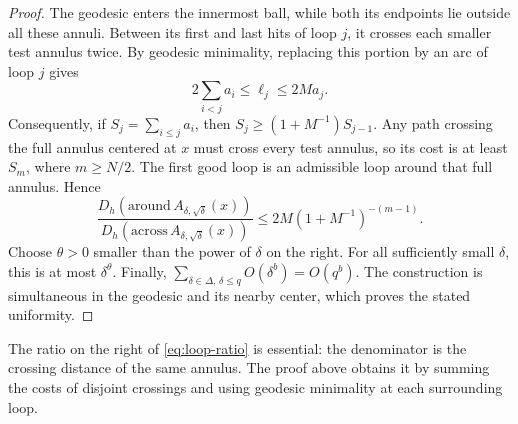 \documentclass[11pt]{article}
\theoremstyle{definition}
\theoremstyle{remark}
\begin{document}
\begin{proof}
The geodesic enters the innermost ball, while both its endpoints
lie outside all these annuli. Between its first and last hits of
loop $j$, it crosses each smaller test annulus twice. By geodesic
minimality, replacing this portion by an arc of loop $j$ gives
\[
                  2\sum_{i<j}a_i\le\ell_j\le2M a_j.
\]
Consequently, if $S_j=\sum_{i\le j}a_i$, then
$S_j\ge(1+M^{-1})S_{j-1}$. Any path crossing the full annulus
centered at $x$ must cross every test annulus, so its cost is at
least $S_m$, where $m\ge N/2$. The first good loop is an
admissible loop around that full annulus. Hence
\[
 \frac{D_h(\mathrm{around}\,A_{\delta,\sqrt\delta}(x))}
      {D_h(\mathrm{across}\,A_{\delta,\sqrt\delta}(x))}
       \le 2M(1+M^{-1})^{-(m-1)}.
\]
Choose $\theta>0$ smaller than the power of $\delta$ on the
right. For all sufficiently small $\delta$, this is at most
$\delta^\theta$. Finally,
$\sum_{\delta\in\Delta,\,\delta\le q}O(\delta^b)=O(q^b)$.
The construction is simultaneous in the geodesic and its nearby
center, which proves the stated uniformity.
\end{proof}

The ratio on the right of \eqref{eq:loop-ratio} is essential:
the denominator is the crossing distance of the same annulus.
The proof above obtains it by summing the costs of disjoint
crossings and using geodesic minimality at each surrounding loop.
\end{document}
